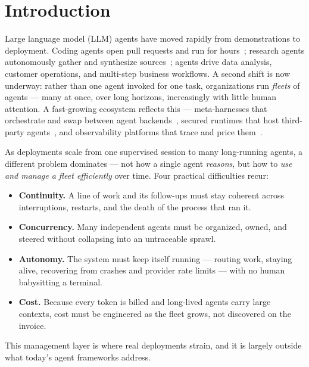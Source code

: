 \documentclass[10pt,twocolumn]{article}
\begin{document}
\section{Introduction}
Large language model (LLM) agents have moved rapidly from demonstrations to
deployment. Coding agents open pull requests and run for hours~\cite{openhands,claudecode};
research agents autonomously gather and synthesize sources~\cite{gptresearcher};
agents drive data analysis, customer operations, and multi-step business workflows. A
second shift is now underway: rather than one agent invoked for one task,
organizations run \emph{fleets} of agents --- many at once, over long horizons,
increasingly with little human attention. A fast-growing ecosystem reflects this ---
meta-harnesses that orchestrate and swap between agent backends~\cite{omnigent,exo},
secured runtimes that host third-party agents~\cite{nemoclaw}, and observability
platforms that trace and price them~\cite{langfuse,agentops}.

As deployments scale from one supervised session to many long-running agents, a
different problem dominates --- not how a single agent \emph{reasons}, but how to
\emph{use and manage a fleet efficiently} over time. Four practical difficulties
recur:
\begin{itemize}[leftmargin=1.1em,itemsep=1.5pt,topsep=2pt]
  \item \textbf{Continuity.} A line of work and its follow-ups must stay coherent
  across interruptions, restarts, and the death of the process that ran it.
  \item \textbf{Concurrency.} Many independent agents must be organized, owned, and
  steered without collapsing into an untraceable sprawl.
  \item \textbf{Autonomy.} The system must keep itself running --- routing work,
  staying alive, recovering from crashes and provider rate limits --- with no human
  babysitting a terminal.
  \item \textbf{Cost.} Because every token is billed and long-lived agents carry
  large contexts, cost must be engineered as the fleet grows, not discovered on the
  invoice.
\end{itemize}
This management layer is where real deployments strain, and it is largely outside what
today's agent frameworks address.
\end{document}
